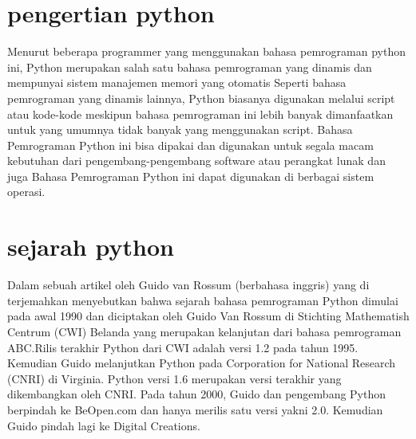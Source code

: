 
\section{pengertian python}
     
      Menurut beberapa  programmer yang menggunakan bahasa pemrograman python ini, Python merupakan salah satu bahasa pemrograman 
      yang dinamis dan mempunyai sistem manajemen memori yang otomatis Seperti bahasa pemrograman yang dinamis lainnya, Python 
      biasanya digunakan melalui script atau kode-kode meskipun bahasa pemrograman ini lebih banyak dimanfaatkan untuk yang umumnya
      tidak banyak yang menggunakan script. Bahasa Pemrograman Python ini bisa dipakai dan digunakan untuk segala macam kebutuhan 
      dari pengembang-pengembang software atau perangkat lunak dan juga Bahasa Pemrograman Python ini dapat digunakan di berbagai 
      sistem operasi.
      
\section {sejarah python}
 
      Dalam sebuah artikel oleh Guido van Rossum (berbahasa inggris) yang di terjemahkan menyebutkan bahwa sejarah bahasa pemrograman 
      Python dimulai pada awal 1990 dan diciptakan oleh Guido Van Rossum di Stichting Mathematish Centrum (CWI) Belanda yang merupakan 
      kelanjutan dari bahasa pemrograman ABC.Rilis terakhir Python dari CWI adalah versi 1.2 pada tahun 1995. Kemudian Guido melanjutkan 
      Python pada Corporation for National Research (CNRI) di Virginia. Python versi 1.6 merupakan versi terakhir yang dikembangkan oleh 
      CNRI. Pada tahun 2000, Guido dan pengembang Python berpindah ke BeOpen.com dan hanya merilis satu versi yakni 2.0. Kemudian 
      Guido pindah lagi ke Digital Creations.

